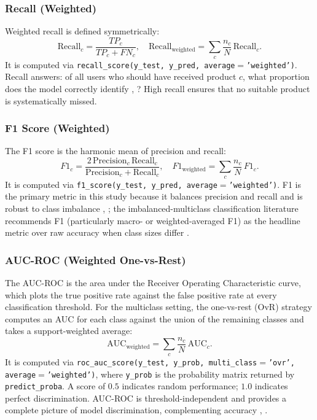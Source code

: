 \documentclass[journal]{./IEEE/IEEEtran}
\begin{document}
\subsubsection{Recall (Weighted)}

Weighted recall is defined symmetrically:
\begin{equation*}
    \mathrm{Recall}_c = \frac{TP_c}{TP_c + FN_c}, \quad \mathrm{Recall}_{\mathrm{weighted}} = \sum_c \frac{n_c}{N}\,\mathrm{Recall}_c.
\end{equation*}
It is computed via \texttt{recall\_score(y\_test, y\_pred, average$=$'weighted')}. Recall answers: of all users who should have received product $c$, what proportion does the model correctly identify \cite{ref79}, \cite{ref78}? High recall ensures that no suitable product is systematically missed.

\subsubsection{F1 Score (Weighted)}

The F1 score is the harmonic mean of precision and recall:
\begin{equation*}
    F1_c = \frac{2\,\mathrm{Precision}_c\,\mathrm{Recall}_c}{\mathrm{Precision}_c + \mathrm{Recall}_c}, \quad F1_{\mathrm{weighted}} = \sum_c \frac{n_c}{N}\,F1_c.
\end{equation*}
It is computed via \texttt{f1\_score(y\_test, y\_pred, average$=$'weighted')}. F1 is the primary metric in this study because it balances precision and recall and is robust to class imbalance \cite{ref78}, \cite{ref80}; the imbalanced-multiclass classification literature recommends F1 (particularly macro- or weighted-averaged F1) as the headline metric over raw accuracy when class sizes differ \cite{ref58}.

\subsubsection{AUC-ROC (Weighted One-vs-Rest)}

The AUC-ROC is the area under the Receiver Operating Characteristic curve, which plots the true positive rate against the false positive rate at every classification threshold. For the multiclass setting, the one-vs-rest (OvR) strategy computes an AUC for each class against the union of the remaining classes and takes a support-weighted average:
\begin{equation*}
    \mathrm{AUC}_{\mathrm{weighted}} = \sum_c \frac{n_c}{N}\,\mathrm{AUC}_c.
\end{equation*}
It is computed via \texttt{roc\_auc\_score(y\_test, y\_prob, multi\_class$=$'ovr', average$=$'weighted')}, where \texttt{y\_prob} is the probability matrix returned by \texttt{predict\_proba}. A score of $0.5$ indicates random performance; $1.0$ indicates perfect discrimination. AUC-ROC is threshold-independent and provides a complete picture of model discrimination, complementing accuracy \cite{ref81}, \cite{ref82}.
\end{document}
